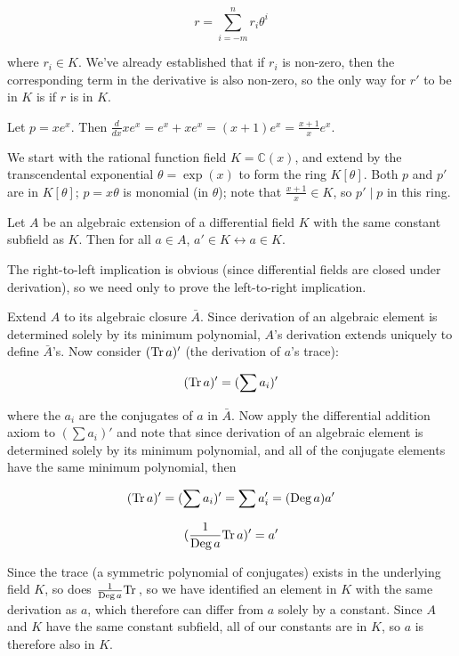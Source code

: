 $$r = \sum_{i=-m}^n r_i \theta^i$$

where $r_i \in K$.  We've already established that if $r_i$ is
non-zero, then the corresponding term in the derivative
is also non-zero, so the only way for $r'$ to be in $K$ is if
$r$ is in $K$.

\endtheorem

\example Let $p = x e^x$.  Then
$\frac{d}{dx} x e^x = e^x + x e^x = (x+1) e^x = \frac{x+1}{x} e^x$.

We start with the rational function field $K = {\mathbb C}(x)$, and
extend by the transcendental exponential $\theta = \exp(x)$ to form
the ring $K[\theta]$.  Both $p$ and $p'$ are in $K[\theta]$;
$p=x\theta$ is monomial (in $\theta$); note that $\frac{x+1}{x} \in
K$, so $p' \mid p$ in this ring.

\endexample

\theorem\label{basic algebraic properties}

Let $A$ be an algebraic extension of a differential field $K$ with the
same constant subfield as $K$.  Then for all $a\in A$, $a' \in K
\leftrightarrow a \in K$.

\proof

The right-to-left implication is obvious (since differential fields
are closed under derivation), so we need only to prove the
left-to-right implication.

Extend $A$ to its algebraic closure $\bar{A}$.  Since derivation of an
algebraic element is determined solely by its minimum polynomial,
$A$'s derivation extends uniquely to define $\bar{A}$'s.  Now
consider $({\rm Tr\,} a)'$ (the derivation of $a$'s trace):

$$({\rm Tr\,} a)' = (\sum a_i)'$$

where the $a_i$ are the conjugates of $a$ in $\bar{A}$.  Now apply the
differential addition axiom to $(\sum a_i)'$ and note that since
derivation of an algebraic element is determined solely by its minimum
polynomial, and all of the conjugate elements have the same minimum
polynomial, then

$$({\rm Tr\,} a)' = (\sum a_i)' = \sum a_i' = ({\rm Deg\,}a) a'$$

$$(\frac{1}{{\rm Deg\,} a}{\rm Tr\,} a)' = a'$$

Since the trace (a symmetric polynomial of conjugates) exists in the
underlying field $K$, so does $\frac{1}{{\rm Deg\,} a}{\rm Tr\,}$, so
we have identified an element in $K$ with the same derivation as $a$,
which therefore can differ from $a$ solely by a constant.  Since $A$
and $K$ have the same constant subfield, all of our constants are in
$K$, so $a$ is therefore also in $K$.

